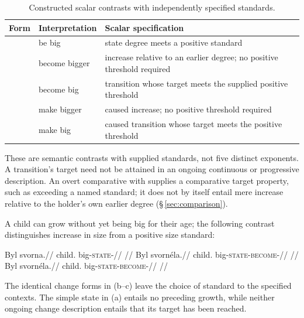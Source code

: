 \begin{table}[htbp]
\footnotesize
\caption{Constructed scalar contrasts with independently specified standards.}
\label{tab:stative-scalar-contrasts}
\begin{tabularx}{\textwidth}{l L L}
\toprule
Form & Interpretation & Scalar specification \\
\midrule
{} & be big & state degree meets a positive standard \\
 & become bigger & increase relative to an earlier degree; no positive threshold required \\
 & become big & transition whose target meets the supplied positive threshold \\
 & make bigger & caused increase; no positive threshold required \\
 & make big & caused transition whose target meets the positive threshold \\
\bottomrule
\end{tabularx}
\end{table}

These are semantic contrasts with supplied standards, not five distinct
exponents. A transition's target need not be attained in an ongoing
continuous or progressive description. An overt comparative with
 supplies a comparative target property, such as exceeding a
named standard; it does not by itself entail mere increase relative to the
holder's own earlier degree (§\,\ref{sec:comparison}).


A child can grow without yet being big for their age; the following
contrast distinguishes increase in size from a positive size standard:

\pex\label{ex:deriv-slot-scalar}
\a
\begingl
\gla Byl svorna.//
\glb child.\Dir{} big-\textsc{state}-\Cont{}//
\glft {}
//
\endgl
\a
\begingl
\gla Byl svornéla.//
\glb child.\Dir{} big-\textsc{state}-\textsc{become}-\Cont{}//
\glft {}
//
\endgl
\a
\begingl
\gla Byl svornéla.//
\glb child.\Dir{} big-\textsc{state}-\textsc{become}-\Cont{}//
\glft {}
//
\endgl
\xe

The identical change forms in (b--c) leave the choice of standard to the
specified contexts. The simple state in (a) entails no preceding growth,
while neither ongoing change description entails that its target has been
reached.

